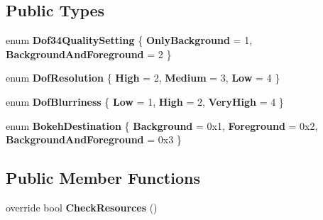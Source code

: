 \subsection*{Public Types}
\begin{DoxyCompactItemize}
\item 
enum {\bfseries Dof34\+Quality\+Setting} \{ {\bfseries Only\+Background} = 1, 
{\bfseries Background\+And\+Foreground} = 2
 \}\hypertarget{class_unity_standard_assets_1_1_image_effects_1_1_depth_of_field_deprecated_a49aeac3eaa0d36567973103fb895b1d9}{}\label{class_unity_standard_assets_1_1_image_effects_1_1_depth_of_field_deprecated_a49aeac3eaa0d36567973103fb895b1d9}

\item 
enum {\bfseries Dof\+Resolution} \{ {\bfseries High} = 2, 
{\bfseries Medium} = 3, 
{\bfseries Low} = 4
 \}\hypertarget{class_unity_standard_assets_1_1_image_effects_1_1_depth_of_field_deprecated_afba0d38461312bf69068aee575fed15d}{}\label{class_unity_standard_assets_1_1_image_effects_1_1_depth_of_field_deprecated_afba0d38461312bf69068aee575fed15d}

\item 
enum {\bfseries Dof\+Blurriness} \{ {\bfseries Low} = 1, 
{\bfseries High} = 2, 
{\bfseries Very\+High} = 4
 \}\hypertarget{class_unity_standard_assets_1_1_image_effects_1_1_depth_of_field_deprecated_ab394b77a427ae602eb2f1d7be04950b2}{}\label{class_unity_standard_assets_1_1_image_effects_1_1_depth_of_field_deprecated_ab394b77a427ae602eb2f1d7be04950b2}

\item 
enum {\bfseries Bokeh\+Destination} \{ {\bfseries Background} = 0x1, 
{\bfseries Foreground} = 0x2, 
{\bfseries Background\+And\+Foreground} = 0x3
 \}\hypertarget{class_unity_standard_assets_1_1_image_effects_1_1_depth_of_field_deprecated_ad61f7567f3a8ba6895d21aca4eee1884}{}\label{class_unity_standard_assets_1_1_image_effects_1_1_depth_of_field_deprecated_ad61f7567f3a8ba6895d21aca4eee1884}

\end{DoxyCompactItemize}
\subsection*{Public Member Functions}
\begin{DoxyCompactItemize}
\item 
override bool {\bfseries Check\+Resources} ()\hypertarget{class_unity_standard_assets_1_1_image_effects_1_1_depth_of_field_deprecated_a58771c7e642e157ab5967aed241c9c3d}{}\label{class_unity_standard_assets_1_1_image_effects_1_1_depth_of_field_deprecated_a58771c7e642e157ab5967aed241c9c3d}

\end{DoxyCompactItemize}
